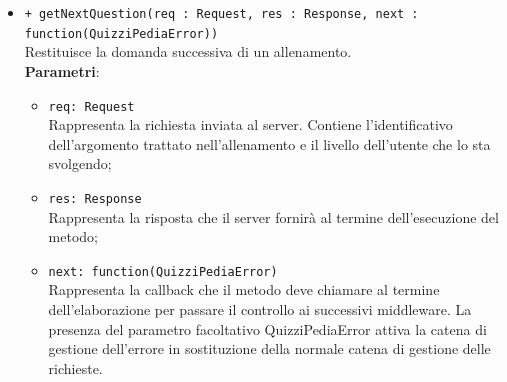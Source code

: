\begin{itemize}
\begin{itemize}
\begin{itemize}
			\end{itemize}
			\item \texttt{+ getNextQuestion(req : Request, res : Response, next : function(QuizziPediaError))} \\
			Restituisce la domanda successiva di un allenamento.  \\
			\textbf{Parametri}:
			\begin{itemize}
			\item \texttt{req: Request} \\
			Rappresenta la richiesta inviata al server. Contiene l'identificativo dell'argomento trattato nell'allenamento e il livello dell'utente che lo sta svolgendo;
			\item \texttt{res: Response} \\
			Rappresenta la risposta che il server fornirà al termine dell'esecuzione del metodo;
			\item \texttt{next: function(QuizziPediaError)} \\
			Rappresenta la callback che il metodo deve chiamare al termine dell'elaborazione per passare il controllo ai successivi middleware. La presenza del parametro facoltativo QuizziPediaError attiva la catena di gestione dell'errore in sostituzione della normale catena di gestione delle richieste.
			\end{itemize}
		\end{itemize}
\end{itemize}